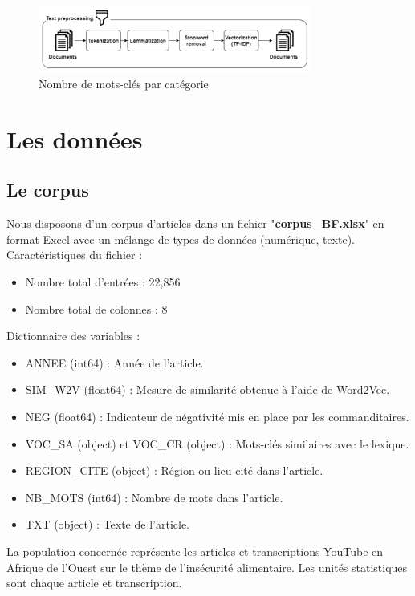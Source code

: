 \documentclass{article}
\begin{document}
\begin{figure}[h]
    \centering
    \includegraphics[width=0.8\textwidth]{textProcess.png}
    \caption{Nombre de mots-clés par catégorie}
    \label{fig:keops_fraiberger}
\end{figure}

\section{Les données}
\subsection{Le corpus}
Nous disposons d'un corpus d'articles dans un fichier "\textbf{corpus_BF.xlsx}" en format Excel avec un mélange de types de données (numérique, texte). \\

Caractéristiques du fichier :
\begin{itemize}
    \item Nombre total d'entrées : 22,856
    \item Nombre total de colonnes : 8 \\
\end{itemize}

Dictionnaire des variables :
\begin{itemize}
    \item ANNEE (int64) : Année de l'article.
    \item SIM_W2V (float64) : Mesure de similarité obtenue à l'aide de Word2Vec.
    \item NEG (float64) : Indicateur de négativité mis en place par les commanditaires.
    \item VOC_SA (object) et VOC_CR (object) : Mots-clés similaires avec le lexique.
    \item REGION_CITE (object) : Région ou lieu cité dans l'article.
    \item NB_MOTS (int64) : Nombre de mots dans l'article.
    \item TXT (object) : Texte de l'article. \\
\end{itemize}

La population concernée représente les articles et transcriptions YouTube en Afrique de l'Ouest sur le thème de l'insécurité alimentaire. Les unités statistiques sont chaque article et transcription. 
\end{document}
